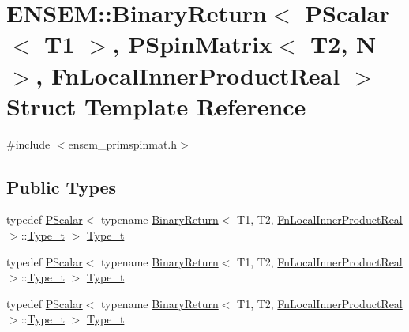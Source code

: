 \hypertarget{structENSEM_1_1BinaryReturn_3_01PScalar_3_01T1_01_4_00_01PSpinMatrix_3_01T2_00_01N_01_4_00_01FnLocalInnerProductReal_01_4}{}\section{E\+N\+S\+EM\+:\+:Binary\+Return$<$ P\+Scalar$<$ T1 $>$, P\+Spin\+Matrix$<$ T2, N $>$, Fn\+Local\+Inner\+Product\+Real $>$ Struct Template Reference}
\label{structENSEM_1_1BinaryReturn_3_01PScalar_3_01T1_01_4_00_01PSpinMatrix_3_01T2_00_01N_01_4_00_01FnLocalInnerProductReal_01_4}


{\ttfamily \#include $<$ensem\+\_\+primspinmat.\+h$>$}

\subsection*{Public Types}
\begin{DoxyCompactItemize}
\item 
typedef \mbox{\hyperlink{classENSEM_1_1PScalar}{P\+Scalar}}$<$ typename \mbox{\hyperlink{structENSEM_1_1BinaryReturn}{Binary\+Return}}$<$ T1, T2, \mbox{\hyperlink{structENSEM_1_1FnLocalInnerProductReal}{Fn\+Local\+Inner\+Product\+Real}} $>$\+::\mbox{\hyperlink{structENSEM_1_1BinaryReturn_3_01PScalar_3_01T1_01_4_00_01PSpinMatrix_3_01T2_00_01N_01_4_00_01FnLocalInnerProductReal_01_4_a2d037716a340f0dc776a97f527be37c6}{Type\+\_\+t}} $>$ \mbox{\hyperlink{structENSEM_1_1BinaryReturn_3_01PScalar_3_01T1_01_4_00_01PSpinMatrix_3_01T2_00_01N_01_4_00_01FnLocalInnerProductReal_01_4_a2d037716a340f0dc776a97f527be37c6}{Type\+\_\+t}}
\item 
typedef \mbox{\hyperlink{classENSEM_1_1PScalar}{P\+Scalar}}$<$ typename \mbox{\hyperlink{structENSEM_1_1BinaryReturn}{Binary\+Return}}$<$ T1, T2, \mbox{\hyperlink{structENSEM_1_1FnLocalInnerProductReal}{Fn\+Local\+Inner\+Product\+Real}} $>$\+::\mbox{\hyperlink{structENSEM_1_1BinaryReturn_3_01PScalar_3_01T1_01_4_00_01PSpinMatrix_3_01T2_00_01N_01_4_00_01FnLocalInnerProductReal_01_4_a2d037716a340f0dc776a97f527be37c6}{Type\+\_\+t}} $>$ \mbox{\hyperlink{structENSEM_1_1BinaryReturn_3_01PScalar_3_01T1_01_4_00_01PSpinMatrix_3_01T2_00_01N_01_4_00_01FnLocalInnerProductReal_01_4_a2d037716a340f0dc776a97f527be37c6}{Type\+\_\+t}}
\item 
typedef \mbox{\hyperlink{classENSEM_1_1PScalar}{P\+Scalar}}$<$ typename \mbox{\hyperlink{structENSEM_1_1BinaryReturn}{Binary\+Return}}$<$ T1, T2, \mbox{\hyperlink{structENSEM_1_1FnLocalInnerProductReal}{Fn\+Local\+Inner\+Product\+Real}} $>$\+::\mbox{\hyperlink{structENSEM_1_1BinaryReturn_3_01PScalar_3_01T1_01_4_00_01PSpinMatrix_3_01T2_00_01N_01_4_00_01FnLocalInnerProductReal_01_4_a2d037716a340f0dc776a97f527be37c6}{Type\+\_\+t}} $>$ \mbox{\hyperlink{structENSEM_1_1BinaryReturn_3_01PScalar_3_01T1_01_4_00_01PSpinMatrix_3_01T2_00_01N_01_4_00_01FnLocalInnerProductReal_01_4_a2d037716a340f0dc776a97f527be37c6}{Type\+\_\+t}}
\end{DoxyCompactItemize}


